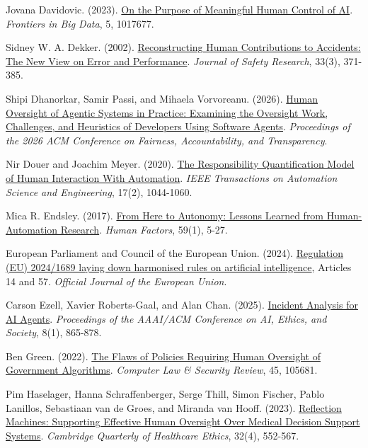 \documentclass[11pt]{article}
\newenvironment{TAEReferences}{%
  \begin{list}{}{%
    \renewcommand{\makelabel}[1]{}%
    \setlength{\labelwidth}{0pt}%
    \setlength{\labelsep}{0pt}%
    \setlength{\leftmargin}{0.5in}%
    \setlength{\itemindent}{-0.5in}%
    \setlength{\itemsep}{0.45em}%
    \setlength{\parsep}{0pt}%
    \setlength{\topsep}{0.25em}%
  }%
}{\end{list}}
\begin{document}
\begin{TAEReferences}
\item Jovana Davidovic. (2023). \href{https://doi.org/10.3389/fdata.2022.1017677}{On the Purpose of Meaningful Human Control of AI}. \emph{Frontiers in Big Data}, 5, 1017677.
\item Sidney W. A. Dekker. (2002). \href{https://doi.org/10.1016/S0022-4375(02)00032-4}{Reconstructing Human Contributions to Accidents: The New View on Error and Performance}. \emph{Journal of Safety Research}, 33(3), 371-385.
\item Shipi Dhanorkar, Samir Passi, and Mihaela Vorvoreanu. (2026). \href{https://doi.org/10.1145/3805689.3812402}{Human Oversight of Agentic Systems in Practice: Examining the Oversight Work, Challenges, and Heuristics of Developers Using Software Agents}. \emph{Proceedings of the 2026 ACM Conference on Fairness, Accountability, and Transparency}.
\item Nir Douer and Joachim Meyer. (2020). \href{https://doi.org/10.1109/TASE.2020.2965466}{The Responsibility Quantification Model of Human Interaction With Automation}. \emph{IEEE Transactions on Automation Science and Engineering}, 17(2), 1044-1060.
\item Mica R. Endsley. (2017). \href{https://doi.org/10.1177/0018720816681350}{From Here to Autonomy: Lessons Learned from Human-Automation Research}. \emph{Human Factors}, 59(1), 5-27.
\item European Parliament and Council of the European Union. (2024). \href{https://eur-lex.europa.eu/eli/reg/2024/1689/oj}{Regulation (EU) 2024/1689 laying down harmonised rules on artificial intelligence}, Articles 14 and 57. \emph{Official Journal of the European Union}.
\item Carson Ezell, Xavier Roberts-Gaal, and Alan Chan. (2025). \href{https://doi.org/10.1609/aies.v8i1.36596}{Incident Analysis for AI Agents}. \emph{Proceedings of the AAAI/ACM Conference on AI, Ethics, and Society}, 8(1), 865-878.
\item Ben Green. (2022). \href{https://doi.org/10.1016/j.clsr.2022.105681}{The Flaws of Policies Requiring Human Oversight of Government Algorithms}. \emph{Computer Law \& Security Review}, 45, 105681.
\item Pim Haselager, Hanna Schraffenberger, Serge Thill, Simon Fischer, Pablo Lanillos, Sebastiaan van de Groes, and Miranda van Hooff. (2023). \href{https://doi.org/10.1017/S0963180122000718}{Reflection Machines: Supporting Effective Human Oversight Over Medical Decision Support Systems}. \emph{Cambridge Quarterly of Healthcare Ethics}, 32(4), 552-567.

\end{TAEReferences}
\end{document}
